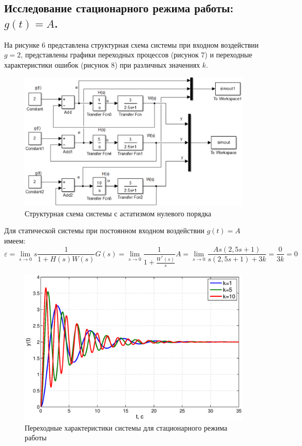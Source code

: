 \documentclass[12pt,a4paper]{article}
\begin{document}
\subsection{Исследование стационарного режима работы: $g(t)=A$.} 
На рисунке 6 представлена структурная схема системы при входном воздействии $g=2$, представлены графики переходных процессов (рисунок 7) и переходные характеристики ошибок (рисунок 8) при различных значениях $k$. 
\begin{figure}[H]
	\centering
	\includegraphics[width=0.8\linewidth]{cxema2.eps}
	\caption{Структурная схема системы с астатизмом нулевого порядка}
\end{figure}
Для статической системы при постоянном входном воздействии $g(t)=A$ имеем:
\begin{equation}
    \varepsilon = \lim_{s\to0} s\frac{1}{1+H(s)W(s)}G(s) = \lim_{s\to0} \frac{1}{1+\displaystyle{\frac{W^*(s)}{s}}}A = \lim_{s\to0} \frac{As(2,5s+1)}{s(2,5s+1)+3k} = \frac{0}{3k} = 0
\end{equation}
\begin{figure}[H]
	\centering
	\includegraphics[width=1\linewidth]{2.1.1.eps}
	\caption{Переходные характеристики системы для стационарного режима работы}
\end{figure}
\end{document}
